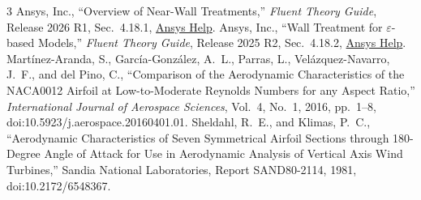 \documentclass[conf]{new-aiaa}
\begin{document}
\begingroup\small
\begin{thebibliography}{3}
 Ansys, Inc., ``Overview of Near-Wall Treatments,'' \textit{Fluent Theory Guide}, Release 2026 R1, Sec.~4.18.1, \href{https://ansyshelp.ansys.com/public/Views/Secured/corp/v261/en/flu_th/flu_th_sec_turb_near_wall_overview.html}{Ansys Help}.
 Ansys, Inc., ``Wall Treatment for $\varepsilon$-based Models,'' \textit{Fluent Theory Guide}, Release 2025 R2, Sec.~4.18.2, \href{https://ansyshelp.ansys.com/public/views/secured/corp/v252/en/flu_th/ch04s18s02.html}{Ansys Help}.
 Mart\'{i}nez-Aranda, S., Garc\'{i}a-Gonz\'{a}lez, A.~L., Parras, L., Vel\'{a}zquez-Navarro, J.~F., and del Pino, C., ``Comparison of the Aerodynamic Characteristics of the NACA0012 Airfoil at Low-to-Moderate Reynolds Numbers for any Aspect Ratio,'' \textit{International Journal of Aerospace Sciences}, Vol.~4, No.~1, 2016, pp.~1--8, doi:10.5923/j.aerospace.20160401.01.
 Sheldahl, R.~E., and Klimas, P.~C., ``Aerodynamic Characteristics of Seven Symmetrical Airfoil Sections through 180-Degree Angle of Attack for Use in Aerodynamic Analysis of Vertical Axis Wind Turbines,'' Sandia National Laboratories, Report SAND80-2114, 1981, doi:10.2172/6548367.
\end{thebibliography}
\endgroup
\end{document}
